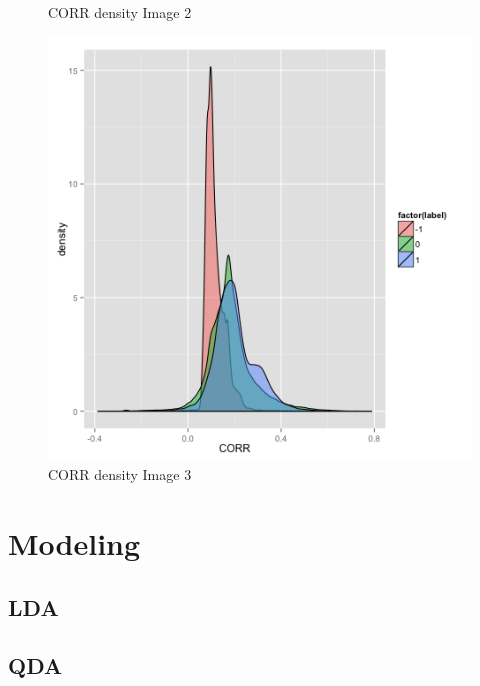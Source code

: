 \documentclass{article}\usepackage[]{graphicx}\usepackage[]{color}
\begin{document}
\begin{figure}[h]
  \caption{CORR density Image 2}\label{}
\endminipage\hfill
{}%
  \includegraphics[width=\linewidth]{CORR3.png}
  \caption{CORR density Image 3}\label{}
\endminipage
\end{figure}


\section{Modeling}

\subsection{LDA}

\subsection{QDA}
\end{document}
